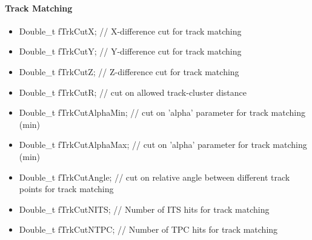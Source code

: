 \paragraph*{Track Matching}
\begin{itemize}

   \item  Double\_t  fTrkCutX;              // X-difference cut for track matching

   \item  Double\_t  fTrkCutY;              // Y-difference cut for track matching

   \item  Double\_t  fTrkCutZ;              // Z-difference cut for track matching

   \item  Double\_t  fTrkCutR;              // cut on allowed track-cluster distance

   \item  Double\_t  fTrkCutAlphaMin;    // cut on 'alpha' parameter for track matching (min)

   \item  Double\_t  fTrkCutAlphaMax;   // cut on 'alpha' parameter for track matching (min)

   \item  Double\_t  fTrkCutAngle;        // cut on relative angle between different track points for track matching

   \item  Double\_t  fTrkCutNITS;         // Number of ITS hits for track matching

   \item  Double\_t  fTrkCutNTPC;         // Number of TPC hits for track matching
\end{itemize}

